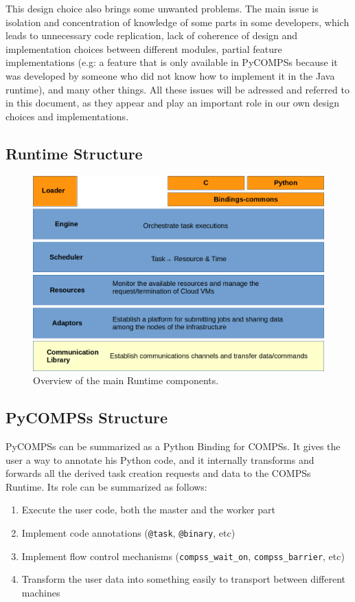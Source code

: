 This design choice also brings some unwanted problems. The main issue is isolation and concentration of knowledge of some parts in some developers, which leads to unnecessary code replication, lack of coherence of design and implementation choices between different modules, partial feature implementations (e.g: a feature that is only available in PyCOMPSs because it was developed by someone who did not know how to implement it in the Java runtime), and many other things. All these issues will be adressed and referred to in this document, as they appear and play an important role in our own design choices and implementations.

\subsection{Runtime Structure}
\label{subsec:runtime_structure}

\begin{figure}
\centering
\includegraphics[scale = 0.45]{figures/runtime_modules.png}
\caption{Overview of the main Runtime components.}
\label{fig:runtime_modules}
\end{figure}

\subsection{PyCOMPSs Structure}
\label{subsec:pycompss_structure}
PyCOMPSs can be summarized as a Python Binding for COMPSs. It gives the user a way to annotate his Python code, and it internally transforms and forwards all the derived task creation requests and data to the COMPSs Runtime. Its role can be summarized as follows:
\begin{enumerate}
\item Execute the user code, both the master and the worker part
\item Implement code annotations (\verb|@task|, \verb|@binary|, etc)
\item Implement flow control mechanisms (\verb|compss_wait_on|, \verb|compss_barrier|, etc)
\item Transform the user data into something easily to transport between different machines
\end{enumerate}

